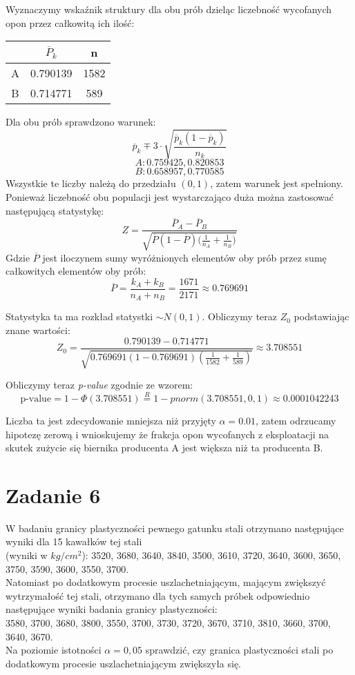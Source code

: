 \documentclass{article}
\begin{document}
Wyznaczymy wskaźnik struktury dla obu prób dzieląc liczebność wycofanych opon przez całkowitą ich ilość:
\begin{center} \begin{tabular}{|c|c|c|} \hline
& $\overline{P}_k$ & n \\ \hline 
A & 0.790139 & 1582 \\ \hline
B & 0.714771 & 589 \\ \hline
\end{tabular} \end{center}

Dla obu prób sprawdzono warunek:
\[ \overline{p}_k \mp 3 \cdot \sqrt{ \frac{\overline{p}_k(1 - \overline{p}_k)}{n_k} } \]
\[ A : 0.759425 , 0.820853 \]
\[ B : 0.658957, 0.770585 \]
Wszystkie te liczby należą do przedziału $(0,1)$, zatem warunek jest spełniony.
Ponieważ liczebność obu populacji jest wystarczająco duża można zastosować następującą statystykę:
\[ Z = \frac{\overline{P}_A - \overline{P}_B}{ \sqrt{\overline{P}(1 - \overline{P}) \big( \frac{1}{n_A} + \frac{1}{n_B} \big)} } \]
Gdzie $\overline{P}$ jest iloczynem sumy wyróżnionych elementów oby prób przez sumę całkowitych elementów oby prób:
\[ \overline{P} = \frac{k_A + k_B}{n_A + n_B} = \frac{1671}{2171} \approx 0.769691 \]

Statystyka ta ma rozkład statystki $\sim N(0,1)$. Obliczymy teraz $Z_0$ podstawiając znane wartości:
\[ Z_0 = \frac{0.790139 - 0.714771}{ \sqrt{ 0.769691 (1 -  0.769691 ) (\frac{1}{1582} + \frac{1}{589}) } } \approx 3.708551 \]

Obliczymy teraz \textit{p-value} zgodnie ze wzorem:
\[ \text{p-value} = 1 - \Phi(3.708551) \overset{R}{=} 1 - pnorm(3.708551, 0, 1) \approx 0.0001042243 \]

Liczba ta jest zdecydowanie mniejsza niż przyjęty $\alpha = 0.01$, zatem odrzucamy hipotezę zerową i wnioskujemy że frakcja opon wycofanych z eksploatacji na skutek zużycie się biernika producenta A jest większa niż ta producenta B.

\newpage
\section{Zadanie 6}
W badaniu granicy plastyczności pewnego gatunku stali otrzymano następujące wyniki dla 15 kawałków tej stali \\
(wyniki w $kg/{cm}^2$): 3520, 3680, 3640, 3840, 3500, 3610, 3720, 3640, 3600, 3650, 3750, 3590, 3600, 3550, 3700. \\
Natomiast po dodatkowym procesie uszlachetniającym, mającym zwiększyć wytrzymałość tej stali, otrzymano dla tych samych próbek odpowiednio następujące wyniki badania granicy plastyczności:\\
3580, 3700, 3680, 3800, 3550, 3700, 3730, 3720, 3670, 3710, 3810, 3660, 3700, 3640, 3670. \\
Na poziomie istotności $\alpha=0,05$ sprawdzić, czy granica plastyczności stali po dodatkowym procesie uszlachetniającym zwiększyła się. \\ \par
\end{document}
